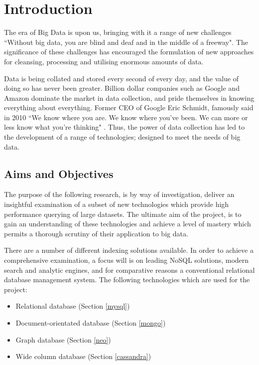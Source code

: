 \chapter*{Introduction}
The era of Big Data is upon us, bringing with it a range of new challenges ``Without big data, you are blind and deaf and in the middle of a freeway"\cite{moore}. The significance of these challenges has encouraged the formulation of new approaches for cleansing, processing and utilising enormous amounts of data.

Data is being collated and stored every second of every day, and the value of doing so has never been greater. Billion dollar companies such as Google and Amazon dominate the market in data collection, and pride themselves in knowing everything about everything. Former CEO of Google Eric Schmidt, famously said in 2010 ``We know where you are. We know where you've been. We can more or less know what you're thinking" \cite{schmidt}. Thus, the power of data collection has led to the development of a range of technologies; designed to meet the needs of big data.

\section{Aims and Objectives}\label{objectives}

The purpose of the following research, is by way of investigation, deliver an insightful examination of a subset of new technologies which provide high performance querying of large datasets. The ultimate aim of the project, is to gain an understanding of these technologies and achieve a level of mastery which permits a thorough scrutiny of their application to big data.

There are a number of different indexing solutions available. In order to achieve a comprehensive examination, a focus will is on leading NoSQL solutions, modern search and analytic engines, and for comparative reasons a conventional relational database management system. The following technologies which are used for the project: 

\begin{itemize}
\item Relational database (Section \ref{mysql})
\item Document-orientated database (Section \ref{mongo})
\item Graph database (Section \ref{neo})
\item Wide column database (Section \ref{cassandra})
\end{itemize}

